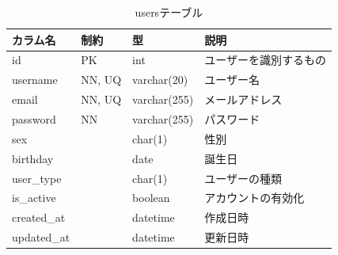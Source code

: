 \begin{table}[H]
  \centering
  \caption{usersテーブル}
  \label{tab:db-users}
  \begin{tabular}{|l|l|l|l|} \hline
    カラム名        & 制約     & 型            & 説明          \\ \hline \hline
    id          & PK     & int          & ユーザーを識別するもの \\ \hline
    username    & NN, UQ & varchar(20)  & ユーザー名       \\ \hline
    email       & NN, UQ & varchar(255) & メールアドレス     \\ \hline
    password    & NN     & varchar(255) & パスワード       \\ \hline
    sex         &        & char(1)      & 性別          \\ \hline
    birthday    &        & date         & 誕生日         \\ \hline
    user\_type  &        & char(1)      & ユーザーの種類     \\ \hline
    is\_active  &        & boolean      & アカウントの有効化   \\ \hline
    created\_at &        & datetime     & 作成日時        \\ \hline
    updated\_at &        & datetime     & 更新日時        \\ \hline
  \end{tabular}
\end{table}

